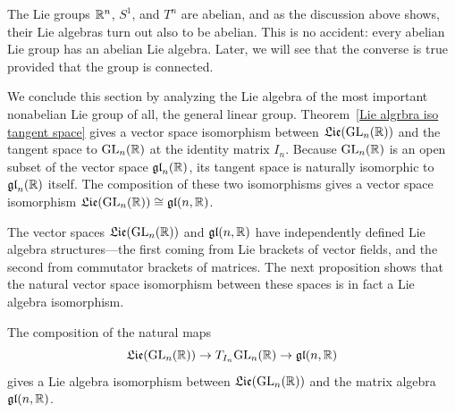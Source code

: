 The Lie groups $\mathbb{R}^n$, $S^1$, and $T^n$ are abelian, and as the discussion above shows, their Lie algebras turn out also to be abelian. This is no accident: every abelian Lie group has an abelian Lie algebra. Later, we will see that the converse is true provided that the group is connected.\par
We conclude this section by analyzing the Lie algebra of the most important nonabelian Lie group of all, the general linear group. Theorem~\ref{Lie algrbra iso tangent space} gives a vector space isomorphism between $\mathfrak{Lie}(\mathrm{GL}_n(\mathbb{R}))$ and the tangent space to $\mathrm{GL}_n(\mathbb{R})$ at the identity matrix $I_n$. Because $\mathrm{GL}_n(\mathbb{R})$ is an open subset of the vector space $\mathfrak{gl}_n(\mathbb{R})$, its tangent space is naturally isomorphic to $\mathfrak{gl}_n(\mathbb{R})$ itself. The composition of these two isomorphisms gives a vector space isomorphism $\mathfrak{Lie}(\mathrm{GL}_n(\mathbb{R}))\cong\mathfrak{gl}(n,\mathbb{R})$.\par
The vector spaces $\mathfrak{Lie}(\mathrm{GL}_n(\mathbb{R}))$ and $\mathfrak{gl}(n,\mathbb{R})$ have independently defined Lie algebra structures---the first coming from Lie brackets of vector fields, and the second from commutator brackets of matrices. The next proposition shows that the natural vector space isomorphism between these spaces is in fact a Lie algebra isomorphism.
\begin{proposition}
The composition of the natural maps
\begin{equation}
\mathfrak{Lie}(\mathrm{GL}_n(\mathbb{R}))\to T_{I_n}\mathrm{GL}_n(\mathbb{R})\to\mathfrak{gl}(n,\mathbb{R})
\end{equation}
gives a Lie algebra isomorphism between $\mathfrak{Lie}(\mathrm{GL}_n(\mathbb{R}))$ and the matrix algebra $\mathfrak{gl}(n,\mathbb{R})$.
\end{proposition}

